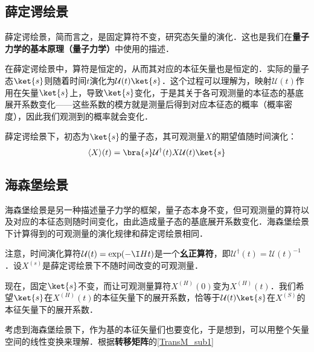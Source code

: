 \subsection{薛定谔绘景}

薛定谔绘景，简而言之，是固定算符不变，研究态矢量的演化．这也是我们在\textbf{量子力学的基本原理（量子力学）}中使用的描述．

在薛定谔绘景中，算符是恒定的，从而其对应的本征矢量也是恒定的．实际的量子态$\ket{s}$则随着时间$t$演化为$\mathcal{U}(t)\ket{s}$．这个过程可以理解为，映射$\mathcal{U}(t)$作用在矢量$\ket{s}$上，导致$\ket{s}$变化，于是其关于各可观测量的本征态的基底展开系数变化——这些系数的模方就是测量后得到对应本征态的概率（概率密度），因此我们观测到的概率就会变化．

薛定谔绘景下，初态为$\ket{s}$的量子态，其可观测量$X$的期望值随时间演化：
\begin{equation}
\langle X \rangle(t) = \bra{s}\mathcal{U}^\dagger(t)X\mathcal{U}(t)\ket{s}
\end{equation}



\subsection{海森堡绘景}

海森堡绘景是另一种描述量子力学的框架，量子态本身不变，但可观测量的算符以及对应的本征态则随时间变化，由此造成量子态的基底展开系数变化．海森堡绘景下计算得到的可观测量的演化规律和薛定谔绘景相同．

注意，时间演化算符$\mathcal{U}(t)=\exp(-\I Ht)$是一个\textbf{幺正算符}，即$\mathcal{U}^\dagger(t)=\mathcal{U}(t)^{-1}$．设$X^{(s)}$是薛定谔绘景下不随时间改变的可观测量．

现在，固定$\ket{s}$不变，而让可观测量算符$X^{(H)}(0)$变为$X^{(H)}(t)$．我们希望$\ket{s}$在$X^{(H)}(t)$的本征矢量下的展开系数，恰等于$\mathcal{U}(t)\ket{s}$在$X^{(S)}$的本征矢量下的展开系数．

考虑到海森堡绘景下，作为基的本征矢量们也要变化，于是想到，可以用整个矢量空间的线性变换来理解．根据\textbf{转移矩阵}的\autoref{TransM_sub1}~


















